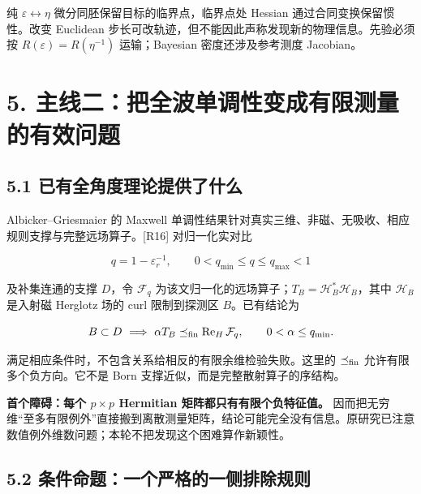 \documentclass[11pt,a4paper]{article}
\begin{document}
纯 \(\varepsilon\leftrightarrow\eta\) 微分同胚保留目标的临界点，临界点处
Hessian 通过合同变换保留惯性。改变 Euclidean
步长可改轨迹，但不能因此声称发现新的物理信息。先验必须按
\(R(\varepsilon)=R(\eta^{-1})\) 运输；Bayesian 密度还涉及参考测度
Jacobian。

\hypertarget{ux4e3bux7ebfux4e8cux628aux5168ux6ce2ux5355ux8c03ux6027ux53d8ux6210ux6709ux9650ux6d4bux91cfux7684ux6709ux6548ux95eeux9898}{%
\section{5.
主线二：把全波单调性变成有限测量的有效问题}\label{ux4e3bux7ebfux4e8cux628aux5168ux6ce2ux5355ux8c03ux6027ux53d8ux6210ux6709ux9650ux6d4bux91cfux7684ux6709ux6548ux95eeux9898}}

\hypertarget{ux5df2ux6709ux5168ux89d2ux5ea6ux7406ux8bbaux63d0ux4f9bux4e86ux4ec0ux4e48}{%
\subsection{5.1
已有全角度理论提供了什么}\label{ux5df2ux6709ux5168ux89d2ux5ea6ux7406ux8bbaux63d0ux4f9bux4e86ux4ec0ux4e48}}

Albicker--Griesmaier 的 Maxwell
单调性结果针对真实三维、非磁、无吸收、相应规则支撑与完整远场算子。{[}R16{]}
对归一化实对比

\[
q=1-\varepsilon_r^{-1},\qquad 0<q_{\min}\le q\le q_{\max}<1
\]

及补集连通的支撑 \(D\)，令 \(\mathcal F_q\)
为该文归一化的远场算子；\(T_B=\mathcal H_B^*\mathcal H_B\)，其中
\(\mathcal H_B\) 是入射磁 Herglotz 场的 curl 限制到探测区
\(B\)。已有结论为

\[
B\subset D\ \Longrightarrow\ 
\alpha T_B\preceq_{\rm fin}\operatorname{Re}_H\mathcal F_q,
\qquad 0<\alpha\le q_{\min}.
\]

满足相应条件时，不包含关系给相反的有限余维检验失败。这里的
\(\preceq_{\rm fin}\) 允许有限多个负方向。它不是 Born
支撑近似，而是完整散射算子的序结构。

\textbf{首个障碍：每个 \(p\times p\) Hermitian
矩阵都只有有限个负特征值。}
因而把无穷维``至多有限例外''直接搬到离散测量矩阵，结论可能完全没有信息。原研究已注意数值例外维数问题；本轮不把发现这个困难算作新颖性。

\hypertarget{ux6761ux4ef6ux547dux9898ux4e00ux4e2aux4e25ux683cux7684ux4e00ux4fa7ux6392ux9664ux89c4ux5219}{%
\subsection{5.2
条件命题：一个严格的一侧排除规则}\label{ux6761ux4ef6ux547dux9898ux4e00ux4e2aux4e25ux683cux7684ux4e00ux4fa7ux6392ux9664ux89c4ux5219}}
\end{document}
